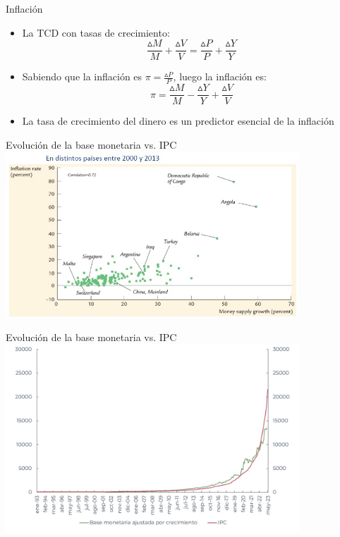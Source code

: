\documentclass{beamer}
\begin{document}
\begin{frame}{Inflación}
    \begin{itemize}
    \item La TCD con tasas de crecimiento: \\
$$\frac{\vartriangle M}{M} + \frac{\vartriangle V}{V} = \frac{\vartriangle P}{P} + \frac{\vartriangle Y}{Y}$$ \vspace{1mm}
    \item Sabiendo que la inflación es $\pi = \frac{\vartriangle P}{P}$, luego la inflación es: \\
    $$\pi = \frac{\vartriangle M}{M} - \frac{\vartriangle Y}{Y} + \frac{\vartriangle V}{V}$$ \vspace{1mm}
    \item La tasa de crecimiento del dinero es un predictor esencial de la inflación
    \end{itemize}
\end{frame}

\begin{frame}{Evolución de la base monetaria vs. IPC}
\centering\includegraphics[width=11cm]{Slides Principios de Economia/Figures/C33.4.jpg}\
\end{frame}

\begin{frame}{Evolución de la base monetaria vs. IPC}
\centering\includegraphics[width=11cm]{Slides Principios de Economia/Figures/38.7 (1).pdf}\
\end{frame}
\end{document}
